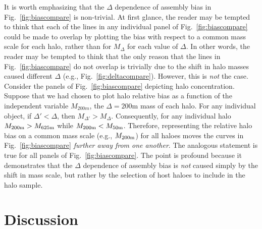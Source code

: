 \documentclass[usenatbib,fleqn]{mnras}
\begin{document}
It is worth emphasizing that the $\Delta$ dependence of assembly bias in Fig.~\ref{fig:biascompare} is non-trivial. At first glance, the reader may be tempted to think that each of the lines in any individual panel of Fig.~\ref{fig:biascompare} could be made to overlap by plotting the bias with respect to a common mass scale for each halo, rather than for $M_{\Delta}$ for each value of $\Delta$. In other words, the reader may be tempted to think that the only reason that the lines in Fig.~\ref{fig:biascompare} do not overlap is trivially due to the shift in halo masses caused different $\Delta$ (e.g., Fig.~\ref{fig:deltacompare}). However, this is {\em not} the case. Consider the panels of Fig.~\ref{fig:biascompare} depicting halo concentration. Suppose that we had chosen to plot halo relative bias as a function of the independent variable $M_{200m}$, the $\Delta=200$m mass of each halo. For any individual object, if $\Delta' < \Delta$, then $M_{\Delta'} > M_{\Delta}$. Consequently, for any individual halo $M_{200{\rm m}} > M_{625{\rm m}}$ while $M_{200{\rm m}} < M_{50{\rm m}}$. Therefore, representing the relative halo bias on a common mass scale (e.g., $M_{200{\rm m}}$) for all haloes moves the curves in Fig.~\ref{fig:biascompare} {\it further away from one another}. The analogous statement is true for all panels of Fig.~\ref{fig:biascompare}. The point is profound because it demonstrates that the $\Delta$ dependence of assembly bias is {\em not} caused simply by the shift in mass scale, but rather by the selection of host haloes to include in the halo sample. 

\section{Discussion}
\label{section:discussion}
\end{document}
